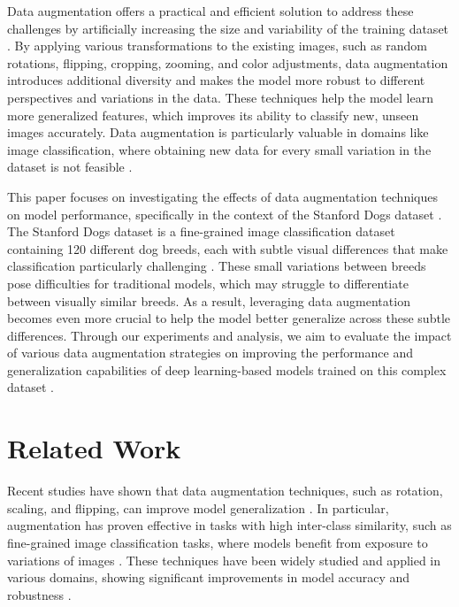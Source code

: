 \documentclass[12pt]{article}
\begin{document}
Data augmentation offers a practical and efficient solution to address these challenges by artificially increasing the size and variability of the training dataset \cite{shorten2019survey}. By applying various transformations to the existing images, such as random rotations, flipping, cropping, zooming, and color adjustments, data augmentation introduces additional diversity and makes the model more robust to different perspectives and variations in the data. These techniques help the model learn more generalized features, which improves its ability to classify new, unseen images accurately. Data augmentation is particularly valuable in domains like image classification, where obtaining new data for every small variation in the dataset is not feasible \cite{shorten2019survey}.

This paper focuses on investigating the effects of data augmentation techniques on model performance, specifically in the context of the Stanford Dogs dataset \cite{wah2011stanford}. The Stanford Dogs dataset is a fine-grained image classification dataset containing 120 different dog breeds, each with subtle visual differences that make classification particularly challenging \cite{wah2011stanford}. These small variations between breeds pose difficulties for traditional models, which may struggle to differentiate between visually similar breeds. As a result, leveraging data augmentation becomes even more crucial to help the model better generalize across these subtle differences. Through our experiments and analysis, we aim to evaluate the impact of various data augmentation strategies on improving the performance and generalization capabilities of deep learning-based models trained on this complex dataset \cite{shorten2019survey}.



\section{Related Work}
Recent studies have shown that data augmentation techniques, such as rotation, scaling, and flipping, can improve model generalization \cite{author_year}. In particular, augmentation has proven effective in tasks with high inter-class similarity, such as fine-grained image classification tasks, where models benefit from exposure to variations of images \cite{author_year}. These techniques have been widely studied and applied in various domains, showing significant improvements in model accuracy and robustness \cite{author_year}.
\end{document}
